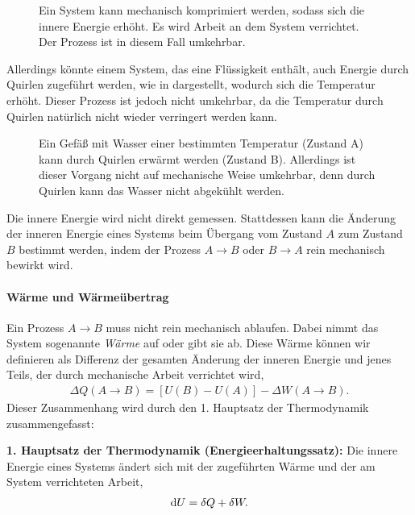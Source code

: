 \begin{figure}[t]
    \centering
    \tfigRectangularBoxWithPiston
    \caption{Ein System kann mechanisch komprimiert werden, sodass sich die innere Energie erhöht. Es wird Arbeit an dem System verrichtet. Der Prozess ist in diesem Fall umkehrbar. }
    \label{fig:RectangularBoxWithPiston}
\end{figure}

Allerdings könnte einem System, das eine Flüssigkeit enthält, auch Energie durch Quirlen zugeführt werden, wie in  dargestellt, wodurch sich die Temperatur erhöht. Dieser Prozess ist jedoch nicht umkehrbar, da die Temperatur durch Quirlen natürlich nicht wieder verringert werden kann.

\begin{figure}[htbp]
    \centering
    \tfigWaterStiringIceCubes
    \caption{Ein Gefäß mit Wasser einer bestimmten Temperatur (Zustand A) kann durch Quirlen erwärmt werden (Zustand B). Allerdings ist dieser Vorgang nicht auf mechanische Weise umkehrbar, denn durch Quirlen kann das Wasser nicht abgekühlt werden. }
    \label{fig:WaterStiringIceCubes}
\end{figure}

\begin{formal}
    Die innere Energie wird nicht direkt gemessen. Stattdessen kann die Änderung der inneren Energie eines Systems beim Übergang vom Zustand $A$ zum Zustand $B$ bestimmt werden, indem der Prozess $A\rightarrow B$ oder $B\rightarrow A$ rein mechanisch bewirkt wird.
\end{formal}



\paragraph*{Wärme und Wärmeübertrag}

Ein Prozess $A\rightarrow B$ muss nicht rein mechanisch ablaufen. Dabei nimmt das System sogenannte \emph{Wärme} auf oder gibt sie ab. Diese Wärme können wir definieren als Differenz der gesamten Änderung der inneren Energie und jenes Teils, der durch mechanische Arbeit verrichtet wird,
\begin{align*}
    \Delta Q(A\rightarrow B) = [U(B)-U(A)] - \Delta W(A\rightarrow B).
\end{align*}
Dieser Zusammenhang wird durch den 1. Hauptsatz der Thermodynamik zusammengefasst:
\begin{formal}
    \textbf{1. Hauptsatz der Thermodynamik (Energieerhaltungssatz):}
    \label{hs:erster}
    Die innere Energie eines Systems ändert sich mit der zugeführten Wärme und der am System verrichteten Arbeit\footnotemark,
    \begin{align*}
        \mathop{}\!\mathrm{d} U = \mathop{}\!\delta Q + \mathop{}\!\delta W.
    \end{align*}
\end{formal}

